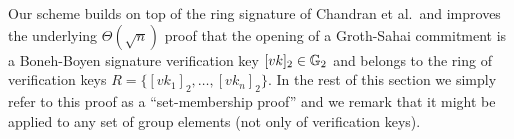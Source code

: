 

%
%
%

Our scheme builds on top of the ring signature of Chandran et al.~and improves the underlying $\Theta(\sqrt{n})$ proof that the opening of a Groth-Sahai commitment is a Boneh-Boyen signature verification key $[vk]_2\in\mathbb{G}_2$ and belongs to the ring of verification keys $R=\{[vk_1]_2,\ldots,[vk_n]_2\}$. In the rest of this section we simply refer to this proof as a ``set-membership proof'' and we remark that it might be applied to any set of group elements (not only of verification keys).

